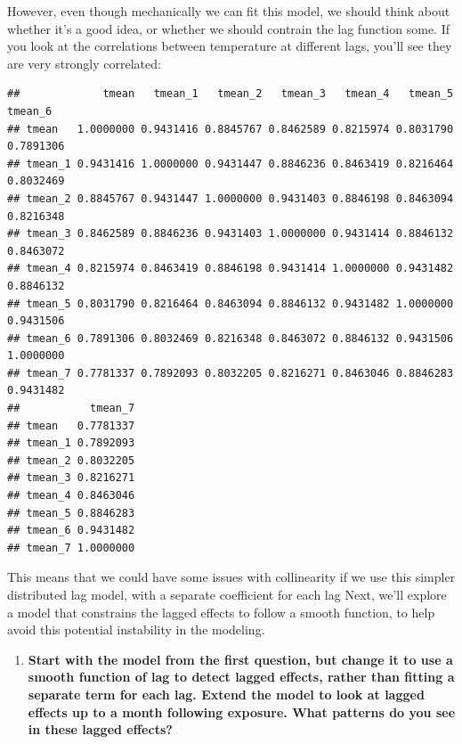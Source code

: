 \documentclass[
]{book}
\newenvironment{Shaded}{\begin{snugshade}}{\end{snugshade}}
\newcommand{\DataTypeTok}[1]{\textcolor[rgb]{0.13,0.29,0.53}{#1}}
\newcommand{\DecValTok}[1]{\textcolor[rgb]{0.00,0.00,0.81}{#1}}
\newcommand{\KeywordTok}[1]{\textcolor[rgb]{0.13,0.29,0.53}{\textbf{#1}}}
\newcommand{\NormalTok}[1]{#1}
\newcommand{\OperatorTok}[1]{\textcolor[rgb]{0.81,0.36,0.00}{\textbf{#1}}}
\newcommand{\StringTok}[1]{\textcolor[rgb]{0.31,0.60,0.02}{#1}}
\providecommand{\tightlist}{%
  \setlength{\itemsep}{0pt}\setlength{\parskip}{0pt}}
\begin{document}
However, even though mechanically we can fit this model, we should think about whether
it's a good idea, or whether we should contrain the lag function some.
If you look at the correlations between temperature at different lags, you'll see they are very
strongly correlated:

\begin{Shaded}
\end{Shaded}

\begin{verbatim}
##             tmean   tmean_1   tmean_2   tmean_3   tmean_4   tmean_5   tmean_6
## tmean   1.0000000 0.9431416 0.8845767 0.8462589 0.8215974 0.8031790 0.7891306
## tmean_1 0.9431416 1.0000000 0.9431447 0.8846236 0.8463419 0.8216464 0.8032469
## tmean_2 0.8845767 0.9431447 1.0000000 0.9431403 0.8846198 0.8463094 0.8216348
## tmean_3 0.8462589 0.8846236 0.9431403 1.0000000 0.9431414 0.8846132 0.8463072
## tmean_4 0.8215974 0.8463419 0.8846198 0.9431414 1.0000000 0.9431482 0.8846132
## tmean_5 0.8031790 0.8216464 0.8463094 0.8846132 0.9431482 1.0000000 0.9431506
## tmean_6 0.7891306 0.8032469 0.8216348 0.8463072 0.8846132 0.9431506 1.0000000
## tmean_7 0.7781337 0.7892093 0.8032205 0.8216271 0.8463046 0.8846283 0.9431482
##           tmean_7
## tmean   0.7781337
## tmean_1 0.7892093
## tmean_2 0.8032205
## tmean_3 0.8216271
## tmean_4 0.8463046
## tmean_5 0.8846283
## tmean_6 0.9431482
## tmean_7 1.0000000
\end{verbatim}

This means that we could have some issues with collinearity if we
use this simpler distributed lag model, with a separate coefficient for each lag
Next, we'll explore a model that constrains the lagged effects to follow a smooth
function, to help avoid this potential instability in the modeling.

\begin{enumerate}
\def\labelenumi{\arabic{enumi}.}
\setcounter{enumi}{1}
\tightlist
\item
  \textbf{Start with the model from the first question, but change it to use a smooth
  function of lag to detect lagged effects, rather than fitting a separate term
  for each lag. Extend the model to look at lagged effects up to a month following
  exposure. What patterns do you see in these lagged effects?}
\end{enumerate}
\end{document}
